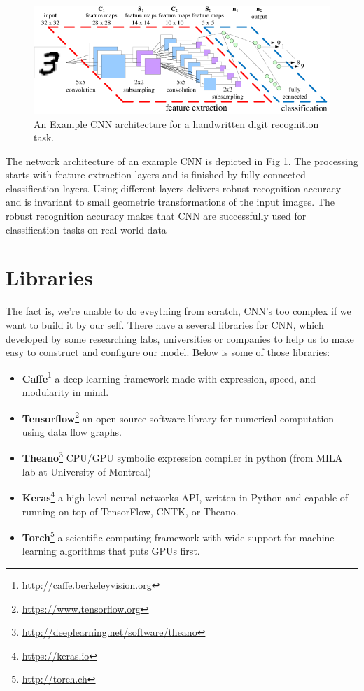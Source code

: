 \documentclass[hidelinks,12pt,a4paper]{report}
\begin{document}
\begin{figure}[ht]
	\includegraphics[scale=1, center]{images/Fig-1-An-Example-CNN-architecture-for-a-handwritten-digit-recognition-task}
	\caption{An Example CNN architecture for a handwritten digit recognition task.}
	\label{fig:CNN-architecture}
\end{figure}
The network architecture of an example CNN is depicted in Fig \ref{fig:CNN-architecture}. The processing starts with feature extraction layers and is finished by fully connected classification layers. Using different layers delivers robust recognition accuracy and is invariant to small geometric transformations of the input images. The robust recognition accuracy makes that CNN are successfully used for classification tasks on real world data
\newpage
\section{Libraries}
The fact is, we're unable to do eveything from scratch, CNN's too complex if we want to build it by our self. There have a several libraries for CNN, which developed by some researching labs, universities or companies to help us to make easy to construct and configure our model. Below is some of those libraries:
\begin{itemize}
	\item \textbf{Caffe}\footnote{\url{http://caffe.berkeleyvision.org}} a deep learning framework made with expression, speed, and modularity in mind.
	\item \textbf{Tensorflow}\footnote{\url{https://www.tensorflow.org}} an open source software library for numerical computation using data flow graphs.
	\item \textbf{Theano}\footnote{\url{http://deeplearning.net/software/theano}} CPU/GPU symbolic expression compiler in python (from MILA lab at University of Montreal)
	\item \textbf{Keras}\footnote{\url{https://keras.io}} a high-level neural networks API, written in Python and capable of running on top of TensorFlow, CNTK, or Theano.
	\item \textbf{Torch}\footnote{\url{http://torch.ch}} a scientific computing framework with wide support for machine learning algorithms that puts GPUs first. 
\end{itemize}
\end{document}
